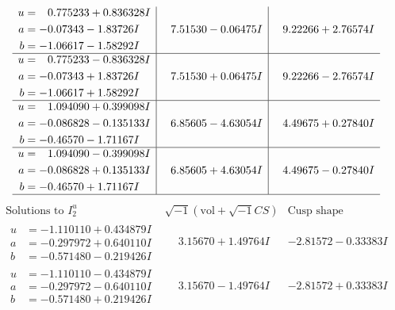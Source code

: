 \documentclass[1p]{elsarticle_modified}
\theoremstyle{definition}
\newcommand{\I}{\sqrt{-1}}
\begin{document}
$$\begin{array}{c|c|c}
\begin{aligned}
u &= \phantom{-}0.775233 + 0.836328 I \\
a &= -0.07343 - 1.83726 I \\
b &= -1.06617 - 1.58292 I\end{aligned}
 & \phantom{-}7.51530 - 0.06475 I & \phantom{-}9.22266 + 2.76574 I \\ \hline\begin{aligned}
u &= \phantom{-}0.775233 - 0.836328 I \\
a &= -0.07343 + 1.83726 I \\
b &= -1.06617 + 1.58292 I\end{aligned}
 & \phantom{-}7.51530 + 0.06475 I & \phantom{-}9.22266 - 2.76574 I \\ \hline\begin{aligned}
u &= \phantom{-}1.094090 + 0.399098 I \\
a &= -0.086828 - 0.135133 I \\
b &= -0.46570 - 1.71167 I\end{aligned}
 & \phantom{-}6.85605 - 4.63054 I & \phantom{-}4.49675 + 0.27840 I \\ \hline\begin{aligned}
u &= \phantom{-}1.094090 - 0.399098 I \\
a &= -0.086828 + 0.135133 I \\
b &= -0.46570 + 1.71167 I\end{aligned}
 & \phantom{-}6.85605 + 4.63054 I & \phantom{-}4.49675 - 0.27840 I\\
 \hline 
 \end{array}$$\newpage$$\begin{array}{c|c|c}  
\text{Solutions to }I^u_{2}& \I (\text{vol} + \sqrt{-1}CS) & \text{Cusp shape}\\
 \hline 
\begin{aligned}
u &= -1.110110 + 0.434879 I \\
a &= -0.297972 + 0.640110 I \\
b &= -0.571480 - 0.219426 I\end{aligned}
 & \phantom{-}3.15670 + 1.49764 I & -2.81572 - 0.33383 I \\ \hline\begin{aligned}
u &= -1.110110 - 0.434879 I \\
a &= -0.297972 - 0.640110 I \\
b &= -0.571480 + 0.219426 I\end{aligned}
 & \phantom{-}3.15670 - 1.49764 I & -2.81572 + 0.33383 I \\ \hline\begin{aligned}

\end{aligned}
\end{array}$$
\end{document}
